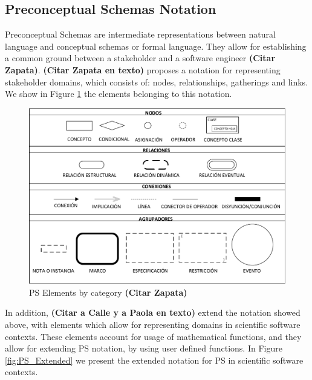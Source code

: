 \documentclass[review]{elsarticle}
\begin{document}
\subsection{Preconceptual Schemas Notation}
Preconceptual Schemas are intermediate representations between natural language and conceptual schemas or formal language. They allow for establishing a common ground between a stakeholder and a software engineer {\color{red} \textbf{(Citar Zapata)}}.{\color{red} \textbf{(Citar Zapata en texto)}} proposes a notation for representing stakeholder domains, which consists of: nodes, relationships, gatherings and links. We show in Figure \ref{fig:PS_Elements} the elements belonging to this notation.

\begin{figure}
	\centering
	\includegraphics[width=1.0\textwidth]{Figures/PSElements.pdf}
	\caption{PS Elements by category {\color{red} \textbf{(Citar Zapata)}}}
	\label{fig:PS_Elements}
\end{figure}

In addition, {\color{red} \textbf{(Citar a Calle y a Paola en texto)}} extend the notation showed above, with elements which allow for representing domains in scientific software contexts. These elements account for usage of mathematical functions, and they allow for extending PS notation, by using user defined functions. In Figure \ref{fig:PS_Extended} we present the extended notation for PS in scientific software contexts.
\end{document}
